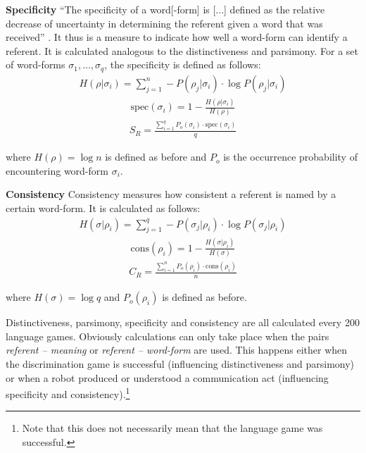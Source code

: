 \begin{description}
\item {\bf Specificity} ``The specificity of a word[-form] is [...] defined as the relative decrease of uncertainty in determining the referent given a word that was received'' \citep{dejong:2000}. It thus is a measure to indicate how well a word-form can identify a referent. It is calculated analogous to the distinctiveness and parsimony. For a set of word-forms $\sigma_1,\ldots,\sigma_q$, the specificity is defined as follows:
\begin{eqnarray}
H(\rho|\sigma_i)=\sum_{j=1}^n -P(\rho_j|\sigma_i) \cdot \log P(\rho_j|\sigma_i)
\end{eqnarray}
\begin{eqnarray}
\mbox{spec}(\sigma_i)=1-\frac{H(\rho|\sigma_i)}{H(\rho)}
\end{eqnarray}
\begin{eqnarray}
S_R=\frac{\sum_{i=1}^q P_o(\sigma_i) \cdot \mbox{spec}(\sigma_i)}{q}
\end{eqnarray}


where $H(\rho)=\log n$ is defined as before and $P_o$ is the occurrence probability of encountering word-form $\sigma_i$.

\item {\bf Consistency} Consistency measures how consistent a referent is named by a certain word-form. It is calculated as follows:
\begin{eqnarray}
H(\sigma|\rho_i)=\sum_{j=1}^q -P(\sigma_j|\rho_i) \cdot \log P(\sigma_j|\rho_i)
\end{eqnarray}
\begin{eqnarray}
\mbox{cons}(\rho_i)=1-\frac{H(\sigma|\rho_i)}{H(\sigma)}
\end{eqnarray}
\begin{eqnarray}
C_R=\frac{\sum_{i=1}^n P_o(\rho_i) \cdot \mbox{cons}(\rho_i)}{n}
\end{eqnarray}


where $H(\sigma)=\log q$ and $P_o(\rho_i)$ is defined as before.

\end{description}


Distinctiveness, parsimony, specificity and consistency are all calculated every 200 language games. Obviously calculations can only take place when the pairs {\em referent -- meaning} or {\em referent -- word-form} are used. This happens either when the discrimination game is successful (influencing distinctiveness and parsimony) or when a robot produced or understood a communication act (influencing specificity and consistency).\footnote{Note that this does not necessarily mean that the language game was successful.}

